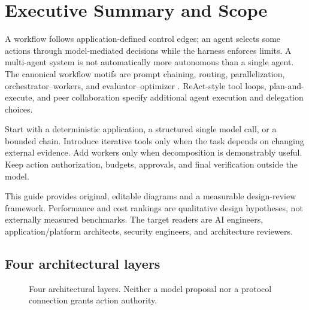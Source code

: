 
\section{Executive Summary and Scope}
A workflow follows application-defined control edges; an agent selects some actions through model-mediated decisions while the harness enforces limits. A multi-agent system is not automatically more autonomous than a single agent. The canonical workflow motifs are prompt chaining, routing, parallelization, orchestrator--workers, and evaluator--optimizer \cite{anthropic}. ReAct-style tool loops, plan-and-execute, and peer collaboration specify additional agent execution and delegation choices.

\begin{infobox}
Start with a deterministic application, a structured single model call, or a bounded chain. Introduce iterative tools only when the task depends on changing external evidence. Add workers only when decomposition is demonstrably useful. Keep action authorization, budgets, approvals, and final verification outside the model.
\end{infobox}

This guide provides original, editable diagrams and a measurable design-review framework. Performance and cost rankings are qualitative design hypotheses, not externally measured benchmarks. The target readers are AI engineers, application/platform architects, security engineers, and architecture reviewers.

\subsection{Four architectural layers}
\begin{figure}[htbp]
\centering
{}
\caption{Four architectural layers. Neither a model proposal nor a protocol connection grants action authority.}
\label{fig:taxonomy}
\end{figure}

